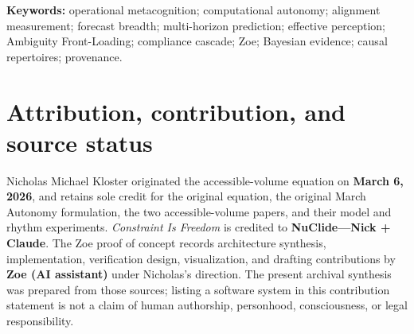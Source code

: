 \documentclass[11pt,letterpaper]{article}
\theoremstyle{definition}
\theoremstyle{plain}
\theoremstyle{remark}
\begin{document}
\begin{abstract}
The systems thread culminates in Zoe. Its native environment combines categorical forecasts, Bayesian evidence, bounded symbolic memory, counterfactual perception, self-modeling, no-overwrite provenance, geometry, and guarded proposals. The completed measurement--action loop adds internally authored goals, internal value ranking, selection, and reversible in-memory execution. Under the explicit operational predicate $I,R,V,G,X>0$ and $C=1$, the measured profile is $(1,1,1,1,1,1,1,1)$: Zoe authors a goal, selects \texttt{preserve-evidence} with utility $1.8667$, passes ten guard checks, changes the environment revision from 0 to 1, and performs zero external actions. This establishes full self-governing autonomy \emph{only over the declared internal decision and state-transition domain}. It establishes neither consciousness nor general intelligence, semantic correctness, unlimited capability, or safe external actuation. Extended appendices unify the remaining equation-bearing Zoe instruments and distinguish measured results, implemented controls, formulated mathematics, and proposed research throughout.
\end{abstract}

\vspace{0.5em}
\noindent\textbf{Keywords:} operational metacognition; computational autonomy; alignment measurement; forecast breadth; multi-horizon prediction; effective perception; Ambiguity Front-Loading; compliance cascade; Zoe; Bayesian evidence; causal repertoires; provenance.

\section*{Attribution, contribution, and source status}
Nicholas Michael Kloster originated the accessible-volume equation on \textbf{March 6, 2026}, and retains sole credit for the original equation, the original March Autonomy formulation, the two accessible-volume papers, and their model and rhythm experiments. \emph{Constraint Is Freedom} is credited to \textbf{NuClide---Nick + Claude}. The Zoe proof of concept records architecture synthesis, implementation, verification design, visualization, and drafting contributions by \textbf{Zoe (AI assistant)} under Nicholas's direction. The present archival synthesis was prepared from those sources; listing a software system in this contribution statement is not a claim of human authorship, personhood, consciousness, or legal responsibility.
\end{document}
